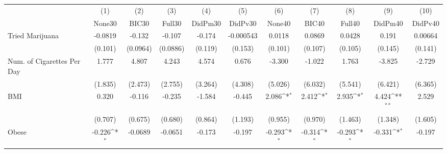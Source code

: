 {
\def\sym#1{\ifmmode^{#1}\else\(^{#1}\)\fi}
\begin{tabular}{l*{10}{c}}
\toprule
            &\multicolumn{1}{c}{(1)}&\multicolumn{1}{c}{(2)}&\multicolumn{1}{c}{(3)}&\multicolumn{1}{c}{(4)}&\multicolumn{1}{c}{(5)}&\multicolumn{1}{c}{(6)}&\multicolumn{1}{c}{(7)}&\multicolumn{1}{c}{(8)}&\multicolumn{1}{c}{(9)}&\multicolumn{1}{c}{(10)}\\
            &\multicolumn{1}{c}{None30}&\multicolumn{1}{c}{BIC30}&\multicolumn{1}{c}{Full30}&\multicolumn{1}{c}{DidPm30}&\multicolumn{1}{c}{DidPv30}&\multicolumn{1}{c}{None40}&\multicolumn{1}{c}{BIC40}&\multicolumn{1}{c}{Full40}&\multicolumn{1}{c}{DidPm40}&\multicolumn{1}{c}{DidPv40}\\
\midrule
Tried Marijuana&     -0.0819         &      -0.132         &      -0.107         &      -0.174         &   -0.000543         &      0.0118         &      0.0869         &      0.0428         &       0.191         &     0.00664         \\
            &     (0.101)         &    (0.0964)         &    (0.0886)         &     (0.119)         &     (0.153)         &     (0.101)         &     (0.107)         &     (0.105)         &     (0.145)         &     (0.141)         \\
\addlinespace
Num. of Cigarettes Per Day&       1.777         &       4.807         &       4.243         &       4.574         &       0.676         &      -3.300         &      -1.022         &       1.763         &      -3.825         &      -2.729         \\
            &     (1.835)         &     (2.473)         &     (2.755)         &     (3.264)         &     (4.308)         &     (5.026)         &     (6.032)         &     (5.541)         &     (6.421)         &     (6.365)         \\
\addlinespace
BMI         &       0.320         &      -0.116         &      -0.235         &      -1.584         &      -0.445         &       2.086\sym{*}  &       2.412\sym{*}  &       2.935\sym{*}  &       4.424\sym{**} &       2.529         \\
            &     (0.707)         &     (0.675)         &     (0.680)         &     (0.864)         &     (1.193)         &     (0.955)         &     (0.970)         &     (1.463)         &     (1.348)         &     (1.605)         \\
\addlinespace
Obese       &      -0.226\sym{*}  &     -0.0689         &     -0.0651         &      -0.173         &      -0.197         &      -0.293\sym{*}  &      -0.314\sym{*}  &      -0.293\sym{*}  &      -0.331\sym{*}  &      -0.197         \\

\end{tabular}}
